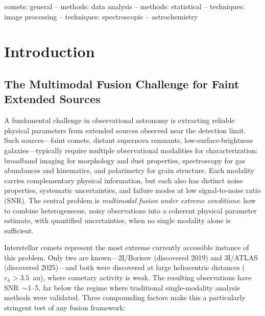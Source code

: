 \documentclass[usenatbib]{mnras}
\begin{document}
\begin{keywords}
comets: general -- methods: data analysis -- methods: statistical -- techniques: image processing -- techniques: spectroscopic -- astrochemistry
\end{keywords}

\section{Introduction}\label{sec:intro}

\subsection{The Multimodal Fusion Challenge for Faint Extended Sources}

A fundamental challenge in observational astronomy is extracting reliable physical parameters from extended sources observed near the detection limit. Such sources---faint comets, distant supernova remnants, low-surface-brightness galaxies---typically require multiple observational modalities for characterization: broadband imaging for morphology and dust properties, spectroscopy for gas abundances and kinematics, and polarimetry for grain structure. Each modality carries complementary physical information, but each also has distinct noise properties, systematic uncertainties, and failure modes at low signal-to-noise ratio (SNR). The central problem is \textit{multimodal fusion under extreme conditions}: how to combine heterogeneous, noisy observations into a coherent physical parameter estimate, with quantified uncertainties, when no single modality alone is sufficient.

Interstellar comets represent the most extreme currently accessible instance of this problem. Only two are known---2I/Borisov (discovered 2019) and 3I/ATLAS (discovered 2025)---and both were discovered at large heliocentric distances ($r_h > 3.5$~au), where cometary activity is weak. The resulting observations have SNR~$\sim$1--5, far below the regime where traditional single-modality analysis methods were validated. Three compounding factors make this a particularly stringent test of any fusion framework:
\end{document}
